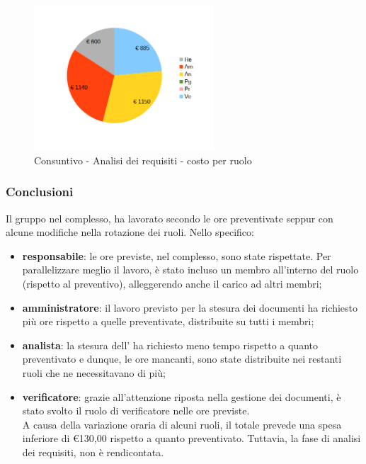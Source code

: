 \begin{figure} [h!]
	\centering
	\includegraphics[width=0.6\textwidth]{res/img/grafici/consuntivo- torta_ costo_per_ora- analisi dei requisiti.png}
	\caption{Consuntivo - Analisi dei requisiti - costo per ruolo} 
\end{figure}

\newpage 

\subsubsection{Conclusioni}
Il gruppo nel complesso, ha lavorato secondo le ore preventivate seppur con alcune modifiche nella rotazione dei ruoli.
Nello specifico:
\begin{itemize}
	\item {\bfseries responsabile}: le ore previste, nel complesso, sono state rispettate. Per parallelizzare meglio il lavoro, è stato incluso un membro all'interno del ruolo (rispetto al preventivo), alleggerendo anche il carico ad altri membri;
	\item {\bfseries amministratore}: il lavoro previsto per la stesura dei documenti ha richiesto più ore rispetto a quelle preventivate, distribuite su tutti i membri;
	\item {\bfseries analista}: la stesura dell' ha richiesto meno tempo rispetto a quanto preventivato e dunque, le ore mancanti, sono state distribuite nei restanti ruoli che ne necessitavano di più;
	\item {\bfseries verificatore}: grazie all'attenzione riposta nella gestione dei documenti, è stato svolto il ruolo di verificatore nelle ore previste.\\
		
	A causa della variazione oraria di alcuni ruoli, il totale prevede una spesa inferiore di \euro 130,00 rispetto a quanto preventivato.
	Tuttavia, la fase di analisi dei requisiti, non è rendicontata.
	
\end{itemize}



